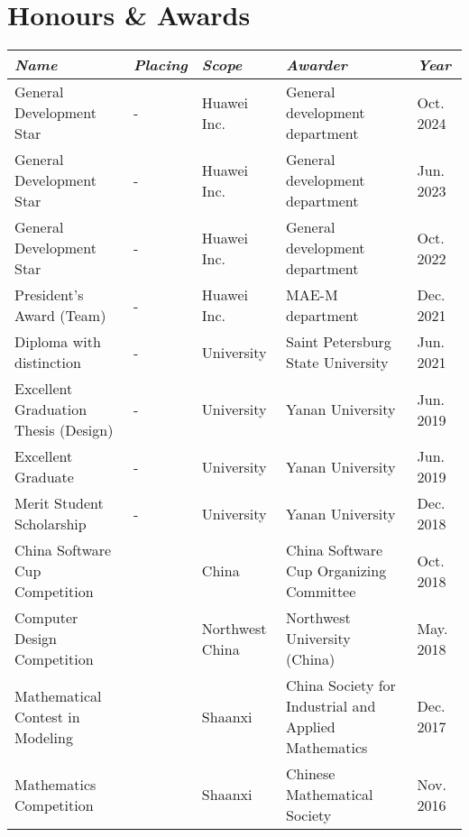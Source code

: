 \documentclass[letterpaper,10pt]{article}
\makeatletter
\newcommand{\awardsTable}[1]{
  \begin{tabularx}{\textwidth}{l @{\extracolsep{\fill}} *{4}{l}}
	\emph{Name}	& \emph{Placing}	& \emph{Scope}	& \emph{Awarder} & \emph{Year}       \\
	\midrule\midrule
	#1
	\end{tabularx}
}
\newcommand{\awardsTableRow}[6]{
	\BeginAccSupp{method=plain, ActualText=11\string\t 21}#1 & #2 & #3 & #4 & #5\EndAccSupp{} \\
}
\makeatother
\begin{document}
\section{Honours \& Awards}
\setlength{\tabcolsep}{6.0pt}
\renewcommand{\arraystretch}{1.1}
\fontsize{8.5}{11}\selectfont
\awardsTable{
  \awardsTableRow{General Development Star}{-}{Huawei Inc.}{General development
                  department}{Oct. 2024} \\
  \awardsTableRow{General Development Star}{-}{Huawei Inc.}{General development
                  department}{Jun. 2023} \\
  \awardsTableRow{General Development Star}{-}{Huawei Inc.}{General development
                  department}{Oct. 2022} \\
  \awardsTableRow{President's Award (Team)}{-}{Huawei Inc.}{MAE-M
                  department}{Dec. 2021} \\
  \awardsTableRow{Diploma with distinction}{-}{University}{Saint Petersburg
                  State University}{Jun. 2021} \\
  \awardsTableRow{Excellent Graduation Thesis (Design)}{-}{University}{Yanan
                  University}{Jun. 2019} \\
  \awardsTableRow{Excellent Graduate}{-}{University}{Yanan University}{Jun.
                  2019} \\
  \awardsTableRow{Merit Student Scholarship}{-}{University}{Yanan
                  University}{Dec. 2018} \\
  \awardsTableRow{China Software Cup Competition}{\nth{3}}{China}{China
                  Software Cup Organizing Committee}{Oct. 2018} \\
  \awardsTableRow{Computer Design Competition}{\nth{3}}{Northwest
                  China}{Northwest University (China)}{May. 2018} \\
  \awardsTableRow{Mathematical Contest in Modeling}{\nth{2}}{Shaanxi}{China
                  Society for Industrial and Applied Mathematics}{Dec. 2017} \\
  \awardsTableRow{Mathematics Competition}{\nth{3}}{Shaanxi}{Chinese
                  Mathematical Society}{Nov. 2016} \\ \hline }
\end{document}
